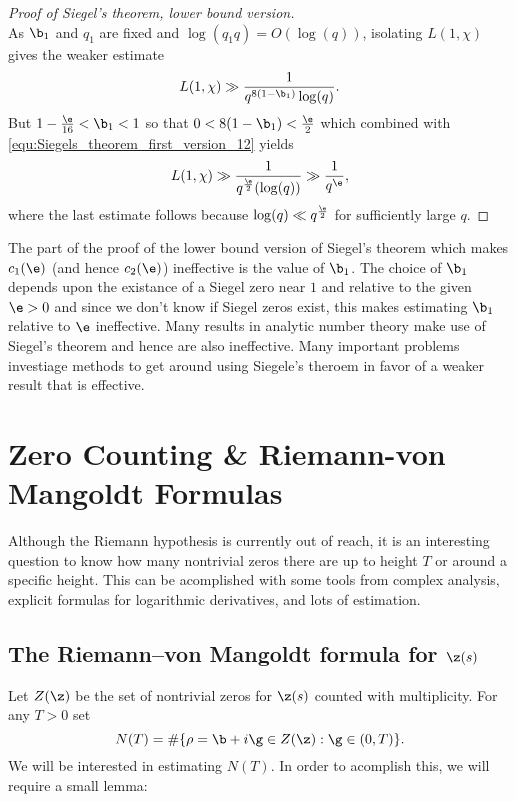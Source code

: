 \begin{proof}[Proof of Siegel's theorem, lower bound version]
\[        \]
        As $\b_{1}$ and $q_{1}$ are fixed and $\log(q_{1}q) = O(\log(q))$, isolating $L(1,\chi)$ gives the weaker estimate
        \begin{equation}\label{equ:Siegels_theorem_first_version_12}
          L(1,\chi) \gg \frac{1}{q^{8(1-\b_{1})}\log(q)}.
        \end{equation}
        But $1-\frac{\e}{16} < \b_{1} < 1$ so that $0 < 8(1-\b_{1}) < \frac{\e}{2}$ which combined with \cref{equ:Siegels_theorem_first_version_12} yields
        \[
          L(1,\chi) \gg \frac{1}{q^{\frac{\e}{2}}(\log(q))} \gg \frac{1}{q^{\e}},
        \]
        where the last estimate follows because $\log(q) \ll q^{\frac{\e}{2}}$ for sufficiently large $q$.
      \end{proof}

      The part of the proof of the lower bound version of Siegel's theorem which makes $c_{1}(\e)$ (and hence $c_{2}(\e)$) ineffective is the value of $\b_{1}$. The choice of $\b_{1}$ depends upon the existance of a Siegel zero near $1$ and relative to the given $\e > 0$ and since we don't know if Siegel zeros exist, this makes estimating $\b_{1}$ relative to $\e$ ineffective. Many results in analytic number theory make use of Siegel's theorem and hence are also ineffective. Many important problems investiage methods to get around using Siegele's theroem in favor of a weaker result that is effective.
  \section{Zero Counting \& Riemann-von Mangoldt Formulas}
    Although the Riemann hypothesis is currently out of reach, it is an interesting question to know how many nontrivial zeros there are up to height $T$ or around a specific height. This can be acomplished with some tools from complex analysis, explicit formulas for logarithmic derivatives, and lots of estimation.
    \subsection*{The Riemann–von Mangoldt formula for $\z(s)$}
      Let $Z(\z)$ be the set of nontrivial zeros for $\z(s)$ counted with multiplicity. For any $T > 0$ set
      \[
        N(T) = \#\{\rho = \b+i\g \in Z(\z): \g \in (0,T)\}.
      \]
      We will be interested in estimating $N(T)$. In order to acomplish this, we will require a small lemma:

